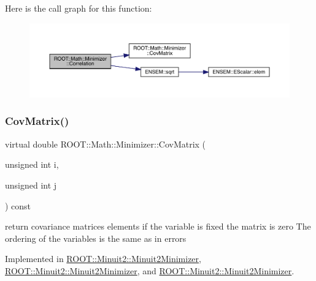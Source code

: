 Here is the call graph for this function\+:
\nopagebreak
\begin{figure}[H]
\begin{center}
\leavevmode
\includegraphics[width=350pt]{dc/dc4/classROOT_1_1Math_1_1Minimizer_a9ba2f4bc3c8c0e905f2c018e79809c0e_cgraph}
\end{center}
\end{figure}
\mbox{\label{classROOT_1_1Math_1_1Minimizer_a01b0ec371972dab12ca3b9c962d952f8}} 
\subsubsection{\texorpdfstring{CovMatrix()}{CovMatrix()}\hspace{0.1cm}{\footnotesize\ttfamily [1/3]}}
{\footnotesize\ttfamily virtual double R\+O\+O\+T\+::\+Math\+::\+Minimizer\+::\+Cov\+Matrix (\begin{DoxyParamCaption}\item[{unsigned int}]{i,  }\item[{unsigned int}]{j }\end{DoxyParamCaption}) const\hspace{0.3cm}{\ttfamily [pure virtual]}}

return covariance matrices elements if the variable is fixed the matrix is zero The ordering of the variables is the same as in errors 

Implemented in \mbox{\hyperlink{classROOT_1_1Minuit2_1_1Minuit2Minimizer_a6ba10de01ab6e7228fa4908894de5619}{R\+O\+O\+T\+::\+Minuit2\+::\+Minuit2\+Minimizer}}, \mbox{\hyperlink{classROOT_1_1Minuit2_1_1Minuit2Minimizer_a6ba10de01ab6e7228fa4908894de5619}{R\+O\+O\+T\+::\+Minuit2\+::\+Minuit2\+Minimizer}}, and \mbox{\hyperlink{classROOT_1_1Minuit2_1_1Minuit2Minimizer_a6ba10de01ab6e7228fa4908894de5619}{R\+O\+O\+T\+::\+Minuit2\+::\+Minuit2\+Minimizer}}.

